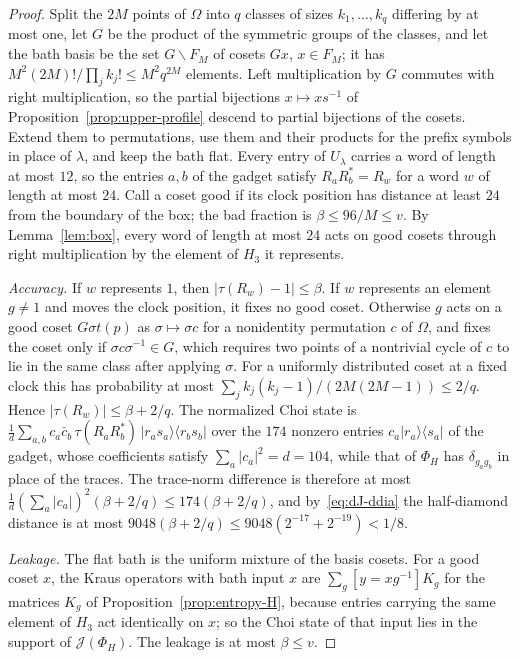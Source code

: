 \documentclass[11pt,a4paper]{article}
\theoremstyle{plain}
\theoremstyle{definition}
\theoremstyle{remark}
\begin{document}
\begin{proof}
Split the $2M$ points of $\Omega$ into $q$ classes of sizes $k_1,\dots,k_q$ differing by at most one, let $G$ be the product of the
symmetric groups of the classes, and let the bath basis be the set $G\backslash F_M$ of cosets $Gx$, $x\in F_M$; it has
$M^2(2M)!/\prod_jk_j!\le M^2q^{2M}$ elements. Left multiplication by $G$ commutes with right multiplication, so the partial
bijections $x\mapsto xs^{-1}$ of Proposition~\ref{prop:upper-profile} descend to partial bijections of the cosets. Extend them to
permutations, use them and their products for the prefix symbols in place of $\lambda$, and keep the bath flat. Every entry of
$U_\lambda$ carries a word of length at most $12$, so the entries $a,b$ of the gadget satisfy $R_aR_b^*=R_w$ for a word $w$ of
length at most $24$. Call a coset good if its clock position has distance at least $24$ from the boundary of the box; the bad
fraction is $\beta\le96/M\le v$. By Lemma~\ref{lem:box}, every word of length at most $24$ acts on good cosets through right
multiplication by the element of $H_3$ it represents.

\emph{Accuracy.} If $w$ represents $1$, then $|\tau(R_w)-1|\le\beta$. If $w$ represents an element $g\ne1$ and moves the clock
position, it fixes no good coset. Otherwise $g$ acts on a good coset $G\sigma t(p)$ as $\sigma\mapsto\sigma c$ for a
nonidentity permutation $c$ of $\Omega$, and fixes the coset only if $\sigma c\sigma^{-1}\in G$, which requires two points of a
nontrivial cycle of $c$ to lie in the same class after applying $\sigma$. For a uniformly distributed coset at a fixed clock
this has probability at most $\sum_jk_j(k_j-1)/(2M(2M-1))\le2/q$. Hence $|\tau(R_w)|\le\beta+2/q$. The normalized Choi state is
$\frac1d\sum_{a,b}c_a\bar c_b\,\tau(R_aR_b^*)\,|r_as_a\rangle\langle r_bs_b|$ over the $174$ nonzero entries $c_a|r_a\rangle\langle s_a|$ of
the gadget, whose coefficients satisfy $\sum_a|c_a|^2=d=104$, while that of $\Phi_H$ has $\delta_{g_ag_b}$ in place of the traces.
The trace-norm difference is therefore at most $\frac1d(\sum_a|c_a|)^2(\beta+2/q)\le174(\beta+2/q)$, and by~\eqref{eq:dJ-ddia}
the half-diamond distance is at most $9048(\beta+2/q)\le9048(2^{-17}+2^{-19})<1/8$.

\emph{Leakage.} The flat bath is the uniform mixture of the basis cosets. For a good coset $x$, the Kraus operators with bath
input $x$ are $\sum_g[y=xg^{-1}]K_g$ for the matrices $K_g$ of Proposition~\ref{prop:entropy-H}, because entries carrying the same
element of $H_3$ act identically on $x$; so the Choi state of that input lies in the support of $\mathcal J(\Phi_H)$. The leakage is
at most $\beta\le v$.
\end{proof}
\end{document}
